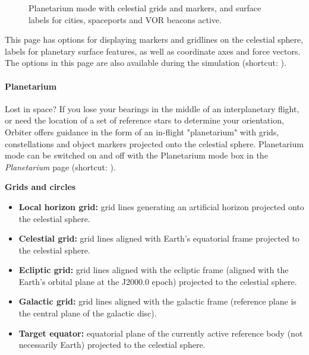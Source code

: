 \documentclass[Orbiter User Manual.tex]{subfiles}
\begin{document}
\begin{figure}[H]
	\centering
	\caption{Planetarium mode with celestial grids and markers, and surface labels for cities, spaceports and VOR beacons active.}
\end{figure}

\noindent
This page has options for displaying markers and gridlines on the celestial sphere, labels for planetary surface features, as well as coordinate axes and force vectors. The options in this page are also available during the simulation (shortcut: \Ctrl{}).

\begin{figure}[H]
	\centering
\end{figure}

\paragraph{Planetarium}
Lost in space? If you lose your bearings in the middle of an interplanetary flight, or need the location of a set of reference stars to determine your orientation, Orbiter offers guidance in the form of an in-flight "planetarium" with grids, constellations and object markers projected onto the celestial sphere. Planetarium mode can be switched on and off with the Planetarium mode box in the \textit{Planetarium} page (shortcut: ).


\begin{figure}[H]
	\centering
\end{figure}

\noindent
\textbf{Grids and circles}
\begin{itemize}
\item \textbf{Local horizon grid:} grid lines generating an artificial horizon projected onto the celestial sphere.
\item \textbf{Celestial grid:} grid lines aligned with Earth's equatorial frame projected to the celestial sphere.
\item \textbf{Ecliptic grid:} grid lines aligned with the ecliptic frame (aligned with the Earth's orbital plane at the J2000.0 epoch) projected to the celestial sphere.
\item \textbf{Galactic grid:} grid lines aligned with the galactic frame (reference plane is the central plane of the galactic disc).
\item \textbf{Target equator:} equatorial plane of the currently active reference body (not necessarily Earth) projected to the celestial sphere.
\end{itemize}
\end{document}

